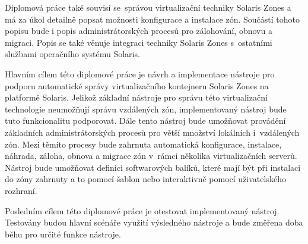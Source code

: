 Diplomová práce také souvisí se~správou virtualizační techniky Solaris Zones a má za úkol detailně popsat možnosti konfigurace a instalace
zón. Součástí tohoto popisu bude i popis administrátorských procesů pro zálohování, obnovu a migraci. Popis se také věnuje integraci
techniky Solaris Zones s~ostatními službami operačního systému Solaris.

Hlavním cílem této diplomové práce je návrh a implementace nástroje pro podporu automatické správy virtualizačního kontejneru
Solaris Zones na platformě Solaris. Jelikož základní nástroje pro správu této virtualizační technologie neumožňují správu vzdálených
zón, implementovaný nástroj bude tuto funkcionalitu podporovat. Dále tento nástroj bude umožňovat provádění základních administrátorských
procesů pro větší množství lokálních i~vzdálených zón. Mezi těmito procesy bude zahrnuta automatická konfigurace, instalace, náhrada,
záloha, obnova a migrace zón v~rámci několika virtualizačních serverů. Nástroj bude umožňovat definici softwarových balíků, které mají být
při instalaci do zóny zahrnuty a to pomocí šablon nebo interaktivně pomocí uživatelského rozhraní.

Posledním cílem této diplomové práce je otestovat implementovaný nástroj. Testovány budou hlavní scénáře využití výsledného nástroje
a bude změřena doba běhu pro určité funkce nástroje.
